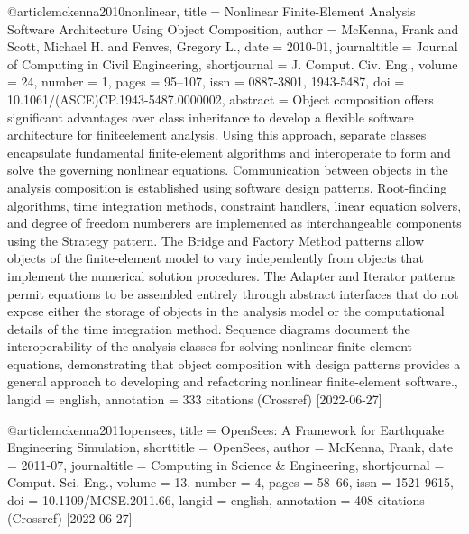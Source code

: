 @article{mckenna2010nonlinear,
  title = {Nonlinear {{Finite-Element Analysis Software Architecture Using Object Composition}}},
  author = {McKenna, Frank and Scott, Michael H. and Fenves, Gregory L.},
  date = {2010-01},
  journaltitle = {Journal of Computing in Civil Engineering},
  shortjournal = {J. Comput. Civ. Eng.},
  volume = {24},
  number = {1},
  pages = {95--107},
  issn = {0887-3801, 1943-5487},
  doi = {10.1061/(ASCE)CP.1943-5487.0000002},
  abstract = {Object composition offers significant advantages over class inheritance to develop a flexible software architecture for finiteelement analysis. Using this approach, separate classes encapsulate fundamental finite-element algorithms and interoperate to form and solve the governing nonlinear equations. Communication between objects in the analysis composition is established using software design patterns. Root-finding algorithms, time integration methods, constraint handlers, linear equation solvers, and degree of freedom numberers are implemented as interchangeable components using the Strategy pattern. The Bridge and Factory Method patterns allow objects of the finite-element model to vary independently from objects that implement the numerical solution procedures. The Adapter and Iterator patterns permit equations to be assembled entirely through abstract interfaces that do not expose either the storage of objects in the analysis model or the computational details of the time integration method. Sequence diagrams document the interoperability of the analysis classes for solving nonlinear finite-element equations, demonstrating that object composition with design patterns provides a general approach to developing and refactoring nonlinear finite-element software.},
  langid = {english},
  annotation = {333 citations (Crossref) [2022-06-27]}
}

@article{mckenna2011opensees,
  title = {{{OpenSees}}: {{A Framework}} for {{Earthquake Engineering Simulation}}},
  shorttitle = {{{OpenSees}}},
  author = {McKenna, Frank},
  date = {2011-07},
  journaltitle = {Computing in Science \& Engineering},
  shortjournal = {Comput. Sci. Eng.},
  volume = {13},
  number = {4},
  pages = {58--66},
  issn = {1521-9615},
  doi = {10.1109/MCSE.2011.66},
  langid = {english},
  annotation = {408 citations (Crossref) [2022-06-27]}
}

